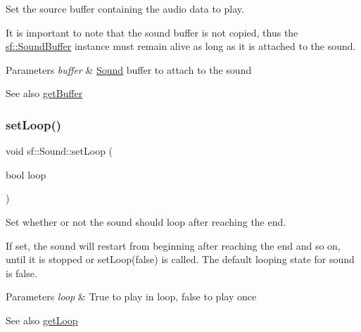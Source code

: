 Set the source buffer containing the audio data to play. 

It is important to note that the sound buffer is not copied, thus the \hyperlink{classsf_1_1_sound_buffer}{sf\+::\+Sound\+Buffer} instance must remain alive as long as it is attached to the sound.


\begin{DoxyParams}{Parameters}
{\em buffer} & \hyperlink{classsf_1_1_sound}{Sound} buffer to attach to the sound\\
\hline
\end{DoxyParams}
\begin{DoxySeeAlso}{See also}
\hyperlink{classsf_1_1_sound_ab873727ae652c96b5a9437d7f8d8a44d}{get\+Buffer} 
\end{DoxySeeAlso}
\mbox{\label{classsf_1_1_sound_af23ab4f78f975bbabac031102321612b}} 
\subsubsection{\texorpdfstring{set\+Loop()}{setLoop()}}
{\footnotesize\ttfamily void sf\+::\+Sound\+::set\+Loop (\begin{DoxyParamCaption}\item[{bool}]{loop }\end{DoxyParamCaption})}



Set whether or not the sound should loop after reaching the end. 

If set, the sound will restart from beginning after reaching the end and so on, until it is stopped or set\+Loop(false) is called. The default looping state for sound is false.


\begin{DoxyParams}{Parameters}
{\em loop} & True to play in loop, false to play once\\
\hline
\end{DoxyParams}
\begin{DoxySeeAlso}{See also}
\hyperlink{classsf_1_1_sound_a054da07266ce8f39229495146e3041eb}{get\+Loop} 
\end{DoxySeeAlso}
\mbox{\label{classsf_1_1_sound_ab905677846558042022dd6ab15cddff0}} 
